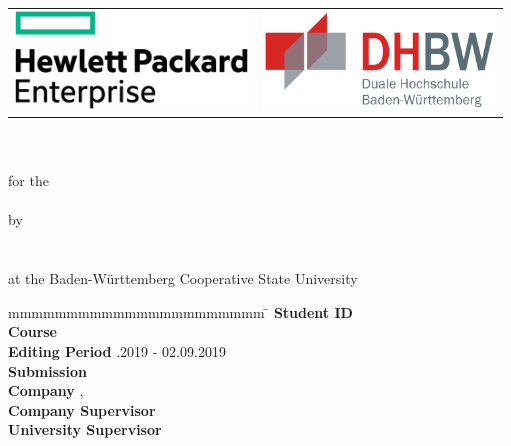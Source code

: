 
\begin{titlepage}
	\begin{longtable}{p{} p{}}
		{\includegraphics[height=2.6cm]{images/hpe.png}} &
		{\includegraphics[height=2.6cm]{images/dhbw.png}}
	\end{longtable}
	\begin{center}
		{\vspace*{12mm}}
		{\LARGE\textbf{\titel}}\\
		\vspace*{4mm}
		\vspace*{12mm}	{\large\textbf{\arbeit}}\\
		\vspace*{3mm}  	for the\\
		\vspace*{3mm} 	{\textbf{\abschluss}}\\
		\vspace*{3mm}	by\\
		\vspace*{3mm} 	{\large\textbf{\autor}}\\
		\vspace*{12mm}	\studiengang\\
		\vspace*{3mm} 	at the Baden-Württemberg Cooperative State University\\
		\vspace*{12mm}
	\end{center}
	\vfill
	\begin{spacing}{1.2}
		\begin{tabbing}
			mmmmmmmmmmmmmmmmmmmmmm     \= \kill
			\textbf{Student ID}  \>  \matrikelnr\\
			\textbf{Course}  \>  \kurs\\
                        \textbf{Editing Period}  .2019 - 02.09.2019\\
                        \textbf{Submission} \> \datumAbgabe\\
			\textbf{Company}      \>  \firma, \firmenort\\
                        \textbf{Company Supervisor}              \>  \betreuer\\
			\textbf{University Supervisor}              \>  \gutachter
		\end{tabbing}
	\end{spacing}
\end{titlepage}
